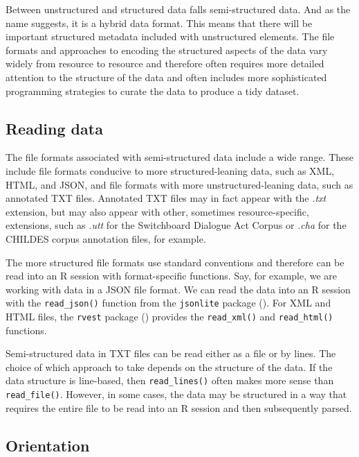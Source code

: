 \documentclass[
  letterpaper,
]{latex/krantz}
\theoremstyle{definition}
\theoremstyle{remark}
\begin{document}
Between unstructured and structured data falls semi-structured data. And
as the name suggests, it is a hybrid data format. This means that there
will be important structured metadata included with unstructured
elements. The file formats and approaches to encoding the structured
aspects of the data vary widely from resource to resource and therefore
often requires more detailed attention to the structure of the data and
often includes more sophisticated programming strategies to curate the
data to produce a tidy dataset.

\subsection{Reading data}\label{reading-data-1}

The file formats associated with semi-structured data include a wide
range. These include file formats conducive to more structured-leaning
data, such as XML, HTML, and JSON, and file formats with more
unstructured-leaning data, such as annotated TXT files. Annotated TXT
files may in fact appear with the \emph{.txt} extension, but may also
appear with other, sometimes resource-specific, extensions, such as
\emph{.utt} for the Switchboard Dialogue Act Corpus or \emph{.cha} for
the CHILDES corpus annotation files, for example.

The more structured file formats use standard conventions and therefore
can be read into an R session with format-specific functions. Say, for
example, we are working with data in a JSON file format. We can read the
data into an R session with the \texttt{read\_json()} function from the
\texttt{jsonlite} package (). For
XML and HTML files, the \texttt{rvest} package
() provides the \texttt{read\_xml()}
and \texttt{read\_html()} functions.

Semi-structured data in TXT files can be read either as a file or by
lines. The choice of which approach to take depends on the structure of
the data. If the data structure is line-based, then
\texttt{read\_lines()} often makes more sense than
\texttt{read\_file()}. However, in some cases, the data may be
structured in a way that requires the entire file to be read into an R
session and then subsequently parsed.

\subsection{Orientation}\label{sec-cd-semi-structured-orientation}
\end{document}
